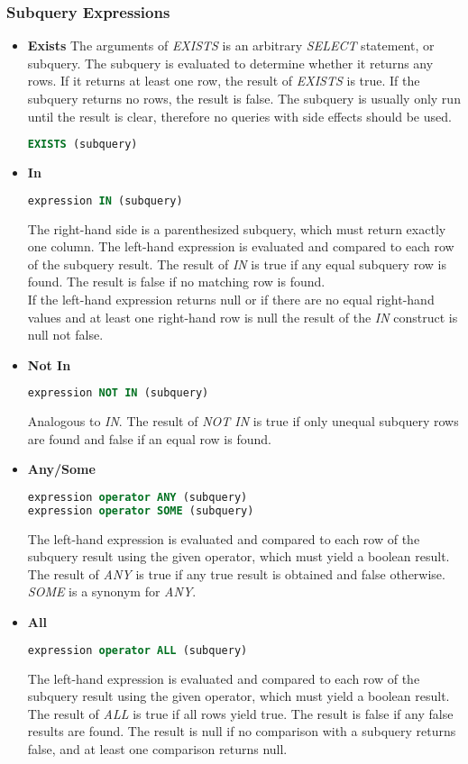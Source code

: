 \subsubsection{Subquery Expressions}
\begin{itemize}
\item \textbf{Exists}
The arguments of \textit{EXISTS} is an arbitrary \textit{SELECT} statement, or subquery. The subquery is evaluated to determine whether it returns any rows. If it returns at least one row, the result of \textit{EXISTS} is true. If the subquery returns no rows, the result is false. The subquery is usually only run until the result is clear, therefore no queries with side effects should be used.
\begin{lstlisting}[language=SQL]
EXISTS (subquery)
\end{lstlisting}
\item \textbf{In}
\begin{lstlisting}[language=SQL]
expression IN (subquery)
\end{lstlisting}
The right-hand side is a parenthesized subquery, which must return exactly one column. The left-hand expression is evaluated and compared to each row of the subquery result. The result of \textit{IN} is true if any equal subquery row is found. The result is false if no matching row is found. \\
If the left-hand expression returns null or if there are no equal right-hand values and at least one right-hand row is null the result of the \textit{IN} construct is null not false.
\item \textbf{Not In}
\begin{lstlisting}[language=SQL]
expression NOT IN (subquery)
\end{lstlisting}
Analogous to \textit{IN}. The result of \textit{NOT IN} is true if only unequal subquery rows are found and false if an equal row is found. 
\item \textbf{Any/Some}
\begin{lstlisting}[language=SQL]
expression operator ANY (subquery)
expression operator SOME (subquery)
\end{lstlisting}
The left-hand expression is evaluated and compared to each row of the subquery result using the given operator, which must yield a boolean result. The result of \textit{ANY} is true if any true result is obtained and false otherwise. \textit{SOME} is a synonym for \textit{ANY}.
\item \textbf{All}
\begin{lstlisting}[language=SQL]
expression operator ALL (subquery)
\end{lstlisting}
The left-hand expression is evaluated and compared to each row of the subquery result using the given operator, which must yield a boolean result. The result of \textit{ALL} is true if all rows yield true. The result is false if any false results are found. The result is null if no comparison with a subquery returns false, and at least one comparison returns null.
\end{itemize}

